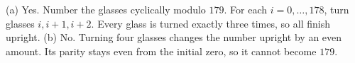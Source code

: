 (a) Yes. Number the glasses cyclically modulo $179$. For each $i=0,\ldots,178$, turn glasses $i,i+1,i+2$. Every glass is turned exactly three times, so all finish upright. (b) No. Turning four glasses changes the number upright by an even amount. Its parity stays even from the initial zero, so it cannot become $179$.
